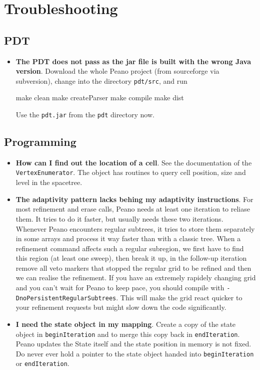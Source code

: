 \chapter{Troubleshooting}

\section{PDT}

\begin{itemize}
  \item {\bf The PDT does not pass as the jar file is built with the wrong Java
  version}. Download the whole Peano project (from sourceforge via subversion),
  change into the directory \texttt{pdt/src}, and run
  \begin{code}
  make clean
  make createParser
  make compile
  make dist
  \end{code}
  Use the \texttt{pdt.jar} from the \texttt{pdt} directory now. 
\end{itemize}





\section{Programming}

\begin{itemize}
  \item {\bf How can I find out the location of a cell}. See the documentation
  of the \texttt{VertexEnumerator}. The object has routines to query cell
  position, size and level in the spacetree.
  \item {\bf The adaptivity pattern lacks behing my adaptivity instructions}.
  For most refinement and erase calls, Peano needs at least one iteration to
  reliase them. It tries to do it faster, but usually needs these two
  iterations. Whenever Peano encounters regular subtrees, it tries to store 
  them separately in some arrays and process it way faster than with a classic
  tree. When a refinement command affects such a regular subregion, we first 
  have to find this region (at least one sweep), then break it up, in the
  follow-up iteration remove all veto markers that stopped the regular grid to
  be refined and then we can realise the refinement. If you have an extremely
  rapidely changing grid and you can't wait for Peano to keep pace, you should
  compile with \texttt{-DnoPersistentRegularSubtrees}. This will make the grid
  react quicker to your refinement requests but might slow down the code
  significantly.
  \item {\bf I need the state object in my mapping}. Create a copy of the state
  object in \texttt{beginIteration} and to merge this copy back in \texttt{endIteration}. 
  Peano updates the State itself and the state position in memory is not fixed.
  Do never ever hold a pointer to the state object handed into
  \texttt{beginIteration} or \texttt{endIteration}.
\end{itemize}


